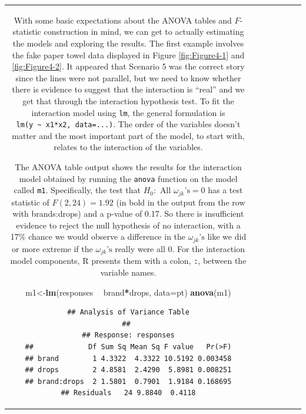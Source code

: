 \documentclass[]{book}
\newenvironment{Shaded}{\begin{snugshade}}{\end{snugshade}}
\newcommand{\KeywordTok}[1]{\textcolor[rgb]{0.13,0.29,0.53}{\textbf{#1}}}
\newcommand{\DataTypeTok}[1]{\textcolor[rgb]{0.13,0.29,0.53}{#1}}
\newcommand{\StringTok}[1]{\textcolor[rgb]{0.31,0.60,0.02}{#1}}
\newcommand{\OperatorTok}[1]{\textcolor[rgb]{0.81,0.36,0.00}{\textbf{#1}}}
\newcommand{\NormalTok}[1]{#1}
\theoremstyle{definition}
\theoremstyle{definition}
\theoremstyle{remark}
\begin{document}
\begin{longtable}[]{@{}ccccccc@{}}
\begin{minipage}[b]{0.10\columnwidth}
With some basic expectations about the ANOVA tables and \(F\)-statistic
construction in mind, we can get to actually estimating the models and
exploring the results. The first example involves the fake paper towel
data displayed in Figure \ref{fig:Figure4-1} and \ref{fig:Figure4-2}. It
appeared that Scenario 5 was the correct story since the lines were not
parallel, but we need to know whether there is evidence to suggest that
the interaction is ``real'' and we get that through the interaction
hypothesis test. To fit the interaction model using \texttt{lm}, the
general formulation is
\texttt{lm(y\ \textasciitilde{}\ x1*x2,\ data=...)}. The order of the
variables doesn't matter and the most important part of the model, to
start with, relates to the interaction of the variables.

The ANOVA table output shows the results for the interaction model
obtained by running the \texttt{anova} function on the model called
\texttt{m1}. Specifically, the test that
\(H_0: \text{ All } \omega_{jk}\text{'s} = 0\) has a test statistic of
\(F(2,24)=1.92\) (in bold in the output from the row with brands:drops)
and a p-value of 0.17. So there is insufficient evidence to reject the
null hypothesis of no interaction, with a 17\% chance we would observe a
difference in the \(\omega_{jk}\text{'s}\) like we did or more extreme
if the \(\omega_{jk}\text{'s}\) really were all 0. For the interaction
model components, R presents them with a colon, \texttt{:}, between the
variable names.

\begin{Shaded}
\begin{Highlighting}[]
\NormalTok{m1<-}\KeywordTok{lm}\NormalTok{(responses }\OperatorTok{~}\StringTok{ }\NormalTok{brand}\OperatorTok{*}\NormalTok{drops, }\DataTypeTok{data=}\NormalTok{pt)}
\KeywordTok{anova}\NormalTok{(m1)}
\end{Highlighting}
\end{Shaded}

\begin{verbatim}
## Analysis of Variance Table
## 
## Response: responses
##             Df Sum Sq Mean Sq F value   Pr(>F)
## brand        1 4.3322  4.3322 10.5192 0.003458
## drops        2 4.8581  2.4290  5.8981 0.008251
## brand:drops  2 1.5801  0.7901  1.9184 0.168695
## Residuals   24 9.8840  0.4118
\end{verbatim}


\end{minipage}
\end{longtable}
\end{document}

